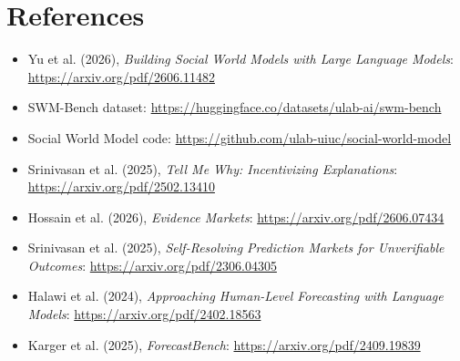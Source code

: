 \documentclass[11pt]{article}
\begin{document}
\section{References}
\begin{itemize}
\item Yu et al. (2026), \textit{Building Social World Models with Large Language Models}: \url{https://arxiv.org/pdf/2606.11482}
\item SWM-Bench dataset: \url{https://huggingface.co/datasets/ulab-ai/swm-bench}
\item Social World Model code: \url{https://github.com/ulab-uiuc/social-world-model}
\item Srinivasan et al. (2025), \textit{Tell Me Why: Incentivizing Explanations}: \url{https://arxiv.org/pdf/2502.13410}
\item Hossain et al. (2026), \textit{Evidence Markets}: \url{https://arxiv.org/pdf/2606.07434}
\item Srinivasan et al. (2025), \textit{Self-Resolving Prediction Markets for Unverifiable Outcomes}: \url{https://arxiv.org/pdf/2306.04305}
\item Halawi et al. (2024), \textit{Approaching Human-Level Forecasting with Language Models}: \url{https://arxiv.org/pdf/2402.18563}
\item Karger et al. (2025), \textit{ForecastBench}: \url{https://arxiv.org/pdf/2409.19839}
\end{itemize}
\end{document}
